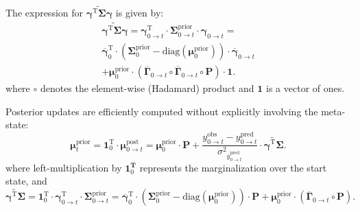 \documentclass[pdflatex,sn-mathphys-num]{sn-jnl}%
\theoremstyle{thmstyleone}%
\theoremstyle{thmstyletwo}%
\theoremstyle{thmstylethree}%
\begin{document}
The expression for \( \widetilde{\mathbf{\gamma}^{\mathrm{T}} \mathbf{\Sigma}\mathbf{\gamma}} \) is given by:
\begin{multline}
	\widetilde{\mathbf{\gamma}^{\mathrm{T}} \mathbf{\Sigma}\mathbf{\gamma}}=   \mathbf{\gamma}^{\mathrm{T}}_{0 \rightarrow t} \cdot \mathbf{\Sigma}^{\mathrm{prior}}_{0 \rightarrow t} \cdot \mathbf{\gamma}_{0 \rightarrow t} = \\
	\overline{\mathbf{\gamma}}_{0}^{\mathrm{T}} \cdot 
	\left( \mathbf{\Sigma}^{\mathrm{prior}}_{0} - \mathrm{diag}(\mathbf{\mu}^{\mathrm{prior}}_0) \right) \cdot 
	\overline{\mathbf{\gamma}}_{0 \rightarrow t} \\
	+ \mathbf{\mu}^{\mathrm{prior}}_0 \cdot \left( \overline{\mathbf{\Gamma}}_{0 \rightarrow t} \circ \overline{\mathbf{\Gamma}}_{0 \rightarrow t} \circ \mathbf{P} \right) \cdot \mathbf{1}.
	\label{eq:simplified_meta_state}
\end{multline}
where \( \circ \) denotes the element-wise (Hadamard) product and \( \mathbf{1} \) is a vector of ones.

Posterior updates are efficiently computed without explicitly involving the meta-state:
\begin{equation}
	\mathbf{\mu}^{\mathrm{prior}}_{t} = 
	\mathbf{1}_0^{\mathrm{T}} \cdot 
	\mathbf{\mu}^{\mathrm{post}}_{0 \rightarrow t} = \mathbf{\mu}^{\mathrm{prior}}_0 \cdot \boldsymbol{P} + 
	\frac{y^{\mathrm{obs}}_{0 \rightarrow t} - y^{\mathrm{pred}}_{0 \rightarrow t}}{{\sigma^2}_{\overline{y}^{\mathrm{pred}}_{0 \rightarrow t}}} 
	\cdot \widetilde{\boldsymbol{\gamma}^{\mathrm{T}} \boldsymbol{\Sigma}}.
	\label{eq:macro_interval_posterior_mean}
\end{equation}
where left-multiplication by \( \mathbf{1}_0^{\mathbf{T}} \) represents the marginalization over the start state, and
\begin{equation}
	\widetilde{\boldsymbol{\gamma}^{\mathrm{T}} \boldsymbol{\Sigma}} = \mathbf{1}_0^{\mathrm{T}} \cdot \mathbf{\gamma}^{\mathrm{T}}_{0 \rightarrow t} \cdot \mathbf{\Sigma}^{\mathrm{prior}}_{0 \rightarrow t} =
	\overline{\boldsymbol{\gamma}}_{0}^{\mathrm{T}} \cdot 
	\left( \boldsymbol{\Sigma}^{\mathrm{prior}}_{0} - \mathrm{diag}(\boldsymbol{\mu}^{\mathrm{prior}}_0) \right) \cdot \boldsymbol{P} 
	+ \boldsymbol{\mu}^{\mathrm{prior}}_0 \cdot \left( \overline{\boldsymbol{\Gamma}}_{0 \rightarrow t} \circ \boldsymbol{P} \right).
	\label{eq:interval_gamma_sigma}
\end{equation}
\end{document}
